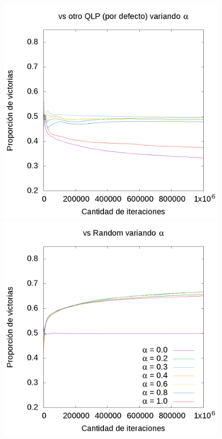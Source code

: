 \documentclass[10pt, a4paper]{article}
\begin{document}
\begin{figure}[H]
\begin{minipage}[c]{1\textwidth}
  \includegraphics[scale=0.25]{AlphaQ.png}
  \includegraphics[trim=230mm 185mm 13mm 90mm, clip, scale=2]{AlphaR.png}

\end{minipage}
\end{figure}
\end{document}
